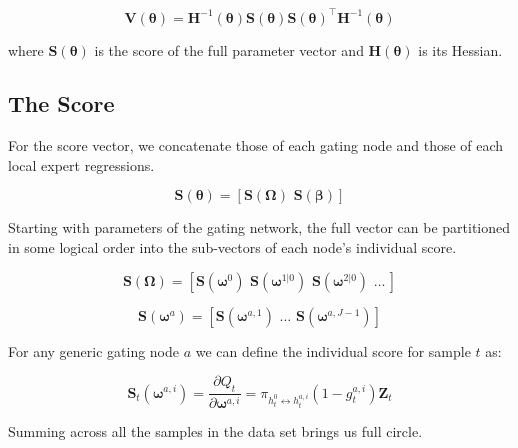 \documentclass[12pt]{article}
\newcommand{\HH}[1]{\boldsymbol{H}(#1)}
\newcommand{\HI}[1]{\boldsymbol{H}^{-1}(#1)}
\newcommand{\gateprod}[2]{\pi_{#1 \longleftrightarrow #2}}
\begin{document}
\begin{equation} \label{eq:robustgatevarcov}
  \boldsymbol{V}(\boldsymbol{\theta}) = \HI{\boldsymbol{\theta}} \boldsymbol{S}(\boldsymbol{\theta}) \boldsymbol{S}(\boldsymbol{\theta})^\top \HI{\boldsymbol{\theta}}
\end{equation}

where $\boldsymbol{S}(\boldsymbol{\theta})$ is the score of the full parameter 
vector and $\HH{\boldsymbol{\theta}}$ is its Hessian.

\subsection{The Score}

For the score vector, we concatenate those of each gating node and those of each
local expert regressions.

\begin{equation}
  \boldsymbol{S}(\boldsymbol{\theta}) = [ \boldsymbol{S}(\boldsymbol{\Omega}) \,\, \boldsymbol{S}(\boldsymbol{\beta}) ]
\end{equation}

Starting with parameters of the gating network, the full vector can be partitioned 
in some logical order into the sub-vectors of each node's individual
score.

\begin{equation}
  \boldsymbol{S}(\boldsymbol{\Omega}) = [ \boldsymbol{S}(\boldsymbol{\omega}^{0}) \,\, \boldsymbol{S}(\boldsymbol{\omega}^{1 | 0}) \,\, \boldsymbol{S}(\boldsymbol{\omega}^{2 | 0}) \,\, \ldots \, ]
\end{equation}

\begin{equation}
  \boldsymbol{S}(\boldsymbol{\omega}^{a}) = [ \boldsymbol{S}(\boldsymbol{\omega}^{a, 1}) \,\, \ldots \,\, \boldsymbol{S}(\boldsymbol{\omega}^{a, J - 1}) ]
\end{equation}

For any generic gating node $a$ we can define the individual score for 
sample $t$ as:

\begin{equation} \label{eq:gateScore}
  \boldsymbol{S}_{t}(\boldsymbol{\omega}^{a, i}) = \frac{\partial Q_{t}}{\partial \boldsymbol{\omega}^{a,i}} = \gateprod{h^{0}_{t}}{h^{a,i}_{t}} (1 - g^{a, i}_{t}) \boldsymbol{Z}_{t} 
\end{equation}


Summing across all the samples in the data set brings us full circle.
\end{document}
